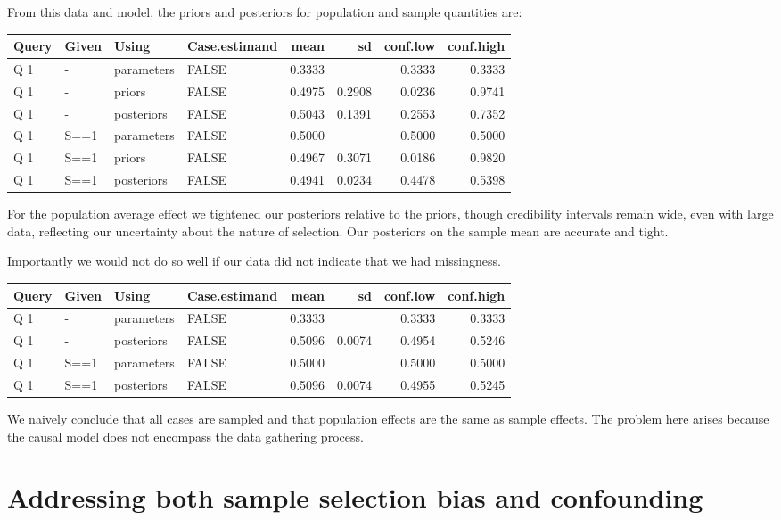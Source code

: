 \documentclass[
  12pt,
]{book}
\begin{document}
From this data and model, the priors and posteriors for population and sample quantities are:

\begin{tabular}{l|l|l|l|r|r|r|r}
\hline
Query & Given & Using & Case.estimand & mean & sd & conf.low & conf.high\\
\hline
Q 1 & - & parameters & FALSE & 0.3333 &  & 0.3333 & 0.3333\\
\hline
Q 1 & - & priors & FALSE & 0.4975 & 0.2908 & 0.0236 & 0.9741\\
\hline
Q 1 & - & posteriors & FALSE & 0.5043 & 0.1391 & 0.2553 & 0.7352\\
\hline
Q 1 & S==1 & parameters & FALSE & 0.5000 &  & 0.5000 & 0.5000\\
\hline
Q 1 & S==1 & priors & FALSE & 0.4967 & 0.3071 & 0.0186 & 0.9820\\
\hline
Q 1 & S==1 & posteriors & FALSE & 0.4941 & 0.0234 & 0.4478 & 0.5398\\
\hline
\end{tabular}

For the population average effect we tightened our posteriors relative to the priors, though credibility intervals remain wide, even with large data, reflecting our uncertainty about the nature of selection. Our posteriors on the sample mean are accurate and tight.

Importantly we would not do so well if our data did not indicate that we had missingness.

\begin{tabular}{l|l|l|l|r|r|r|r}
\hline
Query & Given & Using & Case.estimand & mean & sd & conf.low & conf.high\\
\hline
Q 1 & - & parameters & FALSE & 0.3333 &  & 0.3333 & 0.3333\\
\hline
Q 1 & - & posteriors & FALSE & 0.5096 & 0.0074 & 0.4954 & 0.5246\\
\hline
Q 1 & S==1 & parameters & FALSE & 0.5000 &  & 0.5000 & 0.5000\\
\hline
Q 1 & S==1 & posteriors & FALSE & 0.5096 & 0.0074 & 0.4955 & 0.5245\\
\hline
\end{tabular}

We naively conclude that all cases are sampled and that population effects are the same as sample effects. The problem here arises because the causal model does not encompass the data gathering process.

\hypertarget{addressing-both-sample-selection-bias-and-confounding}{%
\section{Addressing both sample selection bias and confounding}\label{addressing-both-sample-selection-bias-and-confounding}}
\end{document}
